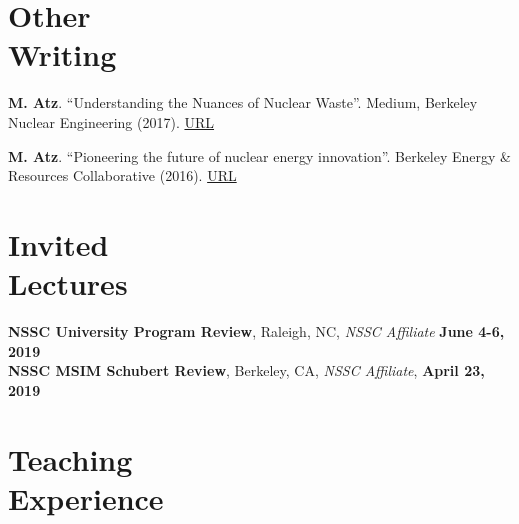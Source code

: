 \documentclass[margin,line]{resume}
\begin{document}
\begin{resume}
\begin{bibenum}
\end{bibenum}
\section{\mysidestyle Other\\Writing}
\begin{bibenum}

    \item \textbf{M. Atz}. ``Understanding the Nuances of Nuclear Waste''. Medium, Berkeley Nuclear Engineering (2017). \href{https://medium.com/berkeley-nuclear-engineering/understanding-the-nuances-of-nuclear-waste-5c123ba4211f}{URL}
    
    \item \textbf{M. Atz}. ``Pioneering the future of nuclear energy innovation''. Berkeley Energy \& Resources Collaborative (2016). \href{http://berc.berkeley.edu/pioneering-future-nuclear-energy-innovation/}{URL}
\end{bibenum}

\vspace{8mm}
\section{\mysidestyle Invited\\Lectures}
\textbf{NSSC University Program Review}, Raleigh, NC, \textsl{NSSC Affiliate} \hfill \textbf{June 4-6, 2019}\\
\textbf{NSSC MSIM Schubert Review}, Berkeley, CA, \textsl{NSSC Affiliate}, \hfill \textbf{April 23, 2019}\\

\section{\mysidestyle Teaching\\Experience}


\end{resume}
\end{document}
